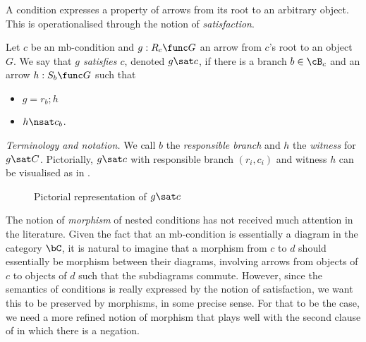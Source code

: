 \medskip\noindent A condition expresses a property of arrows from its root to an arbitrary object. This is operationalised through the notion of \emph{satisfaction}.

\begin{definition}
  Let $c$ be an mb-condition and $g:R_c\func G$ an arrow from $c$'s root to an object $G$. We say that \emph{$g$ satisfies $c$}, denoted $g\sat c$, if there is a branch $b\in \cB_c$ and an arrow $h:S_b\func G$ such that
  \begin{itemize}
  \item $g=r_b;h$
  \item $h\nsat c_b$.
  \end{itemize}
\end{definition}
%
\emph{Terminology and notation.} We call $b$ the \emph{responsible branch} and $h$ the \emph{witness} for $g\sat C$. Pictorially, $g\sat c$ with responsible branch $(r_i,c_i)$ and witness $h$ can be visualised as in .
%
\begin{figure}
  \centering
  
  \caption{Pictorial representation of $g\sat c$}
\end{figure}

\medskip\noindent The notion of \emph{morphism} of nested conditions has not received much attention in the literature. Given the fact that an mb-condition is essentially a diagram in the category $\bC$, it is natural to imagine that a morphism from $c$ to $d$ should essentially be morphism between their diagrams, involving arrows from objects of $c$ to objects of $d$ such that the subdiagrams commute. However, since the semantics of conditions is really expressed by the notion of satisfaction, we want this to be preserved by morphisms, in some precise sense. For that to be the case, we need a more refined notion of morphism that plays well with the second clause of  in which there is a negation.

